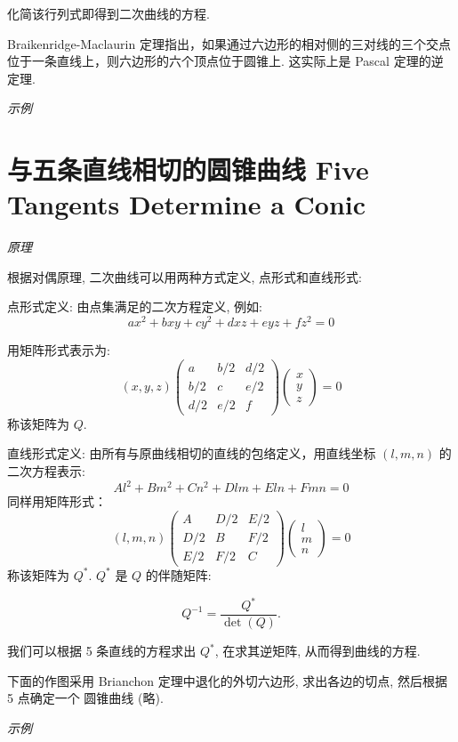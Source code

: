化简该行列式即得到二次曲线的方程.

Braikenridge-Maclaurin 定理指出，如果通过六边形的相对侧的三对线的三个交点位于一条直线上，则六边形的六个顶点位于圆锥上. 这实际上是 Pascal 定理的逆定理.

\emph{示例}


\section{与五条直线相切的圆锥曲线 Five Tangents Determine a Conic}

\emph{原理}

根据对偶原理, 二次曲线可以用两种方式定义, 点形式和直线形式:

点形式定义: 由点集满足的二次方程定义, 例如:
  \[
  ax^2 + bxy + cy^2 + dxz + eyz + fz^2 = 0
  \]
  
用矩阵形式表示为:
  \[
  (x, y, z) \begin{pmatrix} a & b/2 & d/2 \\ b/2 & c & e/2 \\ d/2 & e/2 & f \end{pmatrix} \begin{pmatrix} x \\ y \\ z \end{pmatrix} = 0
  \]
称该矩阵为 \( Q \).

直线形式定义: 由所有与原曲线相切的直线的包络定义，用直线坐标 \( (l, m, n) \) 的二次方程表示:
  \[
  Al^2 + Bm^2 + Cn^2 + Dlm + Eln + Fmn = 0
  \]
同样用矩阵形式：
  \[
  (l, m, n) \begin{pmatrix} A & D/2 & E/2 \\ D/2 & B & F/2 \\ E/2 & F/2 & C \end{pmatrix} \begin{pmatrix} l \\ m \\ n \end{pmatrix} = 0
  \]
称该矩阵为 $Q^*$. $Q^*$ 是 $Q$ 的伴随矩阵:

\[
  Q^{-1} = \dfrac{Q^*}{\det(Q)}.
\]

我们可以根据 5 条直线的方程求出 $Q^*$, 在求其逆矩阵, 从而得到曲线的方程.

下面的作图采用 Brianchon 定理中退化的外切六边形, 求出各边的切点, 然后根据 5 点确定一个
圆锥曲线 (略).

\emph{示例}



